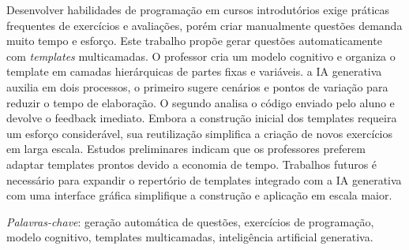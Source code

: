 \begin{resumo}
Desenvolver habilidades de programação em cursos introdutórios exige práticas frequentes de exercícios e avaliações, porém criar manualmente questões demanda muito tempo e esforço. Este trabalho propõe  gerar questões automaticamente com \textit{templates} multicamadas. O professor cria um modelo cognitivo e organiza o template em camadas hierárquicas de partes fixas e variáveis. a IA generativa auxilia em dois processos, o primeiro sugere cenários e pontos de variação para reduzir o tempo de elaboração. O segundo analisa o código enviado pelo aluno e devolve o feedback imediato. Embora a construção inicial dos templates requeira um esforço considerável, sua reutilização simplifica a criação de novos exercícios em larga escala. Estudos preliminares indicam que os professores preferem adaptar templates prontos devido a economia de tempo.  Trabalhos futuros é necessário para expandir o repertório de templates integrado com a IA generativa com uma interface gráfica simplifique a construção e aplicação em escala maior.
 
  \bigbreak

  \noindent
  \textit{Palavras-chave}: geração automática de questões, exercícios de programação, modelo cognitivo, templates multicamadas, inteligência artificial generativa.
\end{resumo}